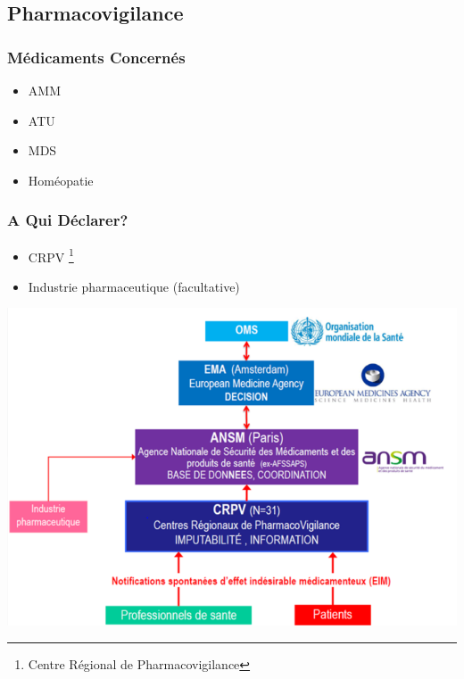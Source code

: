 \documentclass[11pt]{article}
\begin{document}
\subsection{Pharmacovigilance}
\label{sec:org556a094}
\subsubsection{Médicaments Concernés}
\label{sec:org41b1e98}
\begin{itemize}
\item AMM
\item ATU
\item MDS
\item Homéopatie
\end{itemize}
\subsubsection{A Qui Déclarer?}
\label{sec:orgb146897}
\begin{itemize}
\item CRPV \footnote{Centre Régional de Pharmacovigilance}
\item Industrie pharmaceutique (facultative)
\end{itemize}
\begin{center}
\includegraphics[width=.9\linewidth]{./crpv.png}
\end{center}
\end{document}
